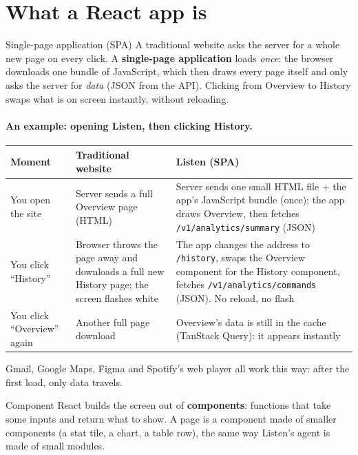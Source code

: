 \documentclass[11pt,a4paper]{article}
\begin{document}
\section{What a React app is}

\begin{concept}{Single-page application (SPA)}
A traditional website asks the server for a whole new page on every click. A \textbf{single-page
application} loads \emph{once}: the browser downloads one bundle of JavaScript, which then draws
every page itself and only asks the server for \emph{data} (JSON from the API). Clicking from
Overview to History swaps what is on screen instantly, without reloading.
\end{concept}

\paragraph{An example: opening Listen, then clicking History.}
\begin{center}
\renewcommand{\arraystretch}{1.2}
\begin{tabularx}{\textwidth}{l X X}
\toprule
\textbf{Moment} & \textbf{Traditional website} & \textbf{Listen (SPA)} \\
\midrule
You open the site & Server sends a full Overview page (HTML) & Server sends one small HTML file + the app's JavaScript bundle (once); the app draws Overview, then fetches \texttt{/v1/analytics/summary} (JSON) \\
You click ``History'' & Browser throws the page away and downloads a full new History page; the screen flashes white & The app changes the address to \texttt{/history}, swaps the Overview component for the History component, fetches \texttt{/v1/analytics/commands} (JSON). No reload, no flash \\
You click ``Overview'' again & Another full page download & Overview's data is still in the cache (TanStack Query): it appears instantly \\
\bottomrule
\end{tabularx}
\end{center}
\noindent Gmail, Google Maps, Figma and Spotify's web player all work this way: after the first
load, only data travels.

\begin{concept}{Component}
React builds the screen out of \textbf{components}: functions that take some inputs and return
what to show. A page is a component made of smaller components (a stat tile, a chart, a table
row), the same way Listen's agent is made of small modules.
\end{concept}
\end{document}

